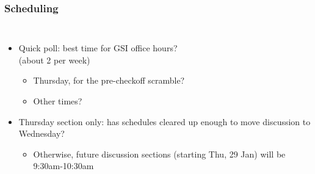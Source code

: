 \documentclass{beamer}
\begin{document}
\begin{frame}
\frametitle{Scheduling}
\begin{columns}[t]
\begin{itemize}
  \item Quick poll: best time for GSI office hours? \\
  (about 2 per week)
  \begin{itemize}
    \item Thursday, for the pre-checkoff scramble?
    \item Other times?
  \end{itemize}
  \item Thursday section only: has schedules cleared up enough to move discussion to Wednesday?
  \begin{itemize}
    \item Otherwise, future discussion sections (starting Thu, 29 Jan) will be 9:30am-10:30am
  \end{itemize}
\end{itemize}

\end{columns}
\end{frame}
\end{document}

